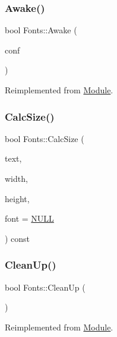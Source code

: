 \subsubsection{\texorpdfstring{Awake()}{Awake()}}
{\footnotesize\ttfamily bool Fonts\+::\+Awake (\begin{DoxyParamCaption}\item[{pugi\+::xml\+\_\+node \&}]{conf }\end{DoxyParamCaption})\hspace{0.3cm}{\ttfamily [virtual]}}



Reimplemented from \mbox{\hyperlink{class_module_a4a283650cf8a73aa0b5599106bc2ba6c}{Module}}.

\mbox{\label{class_fonts_a5210938601222509c4fd3756e2be59ae}} 
\subsubsection{\texorpdfstring{CalcSize()}{CalcSize()}}
{\footnotesize\ttfamily bool Fonts\+::\+Calc\+Size (\begin{DoxyParamCaption}\item[{const char $\ast$}]{text,  }\item[{int \&}]{width,  }\item[{int \&}]{height,  }\item[{\+\_\+\+T\+T\+F\+\_\+\+Font $\ast$}]{font = {\ttfamily \mbox{\hyperlink{_defs_8h_a070d2ce7b6bb7e5c05602aa8c308d0c4}{N\+U\+LL}}} }\end{DoxyParamCaption}) const}

\mbox{\label{class_fonts_afc4912317ca40199a71f7db1024c006d}} 
\subsubsection{\texorpdfstring{CleanUp()}{CleanUp()}}
{\footnotesize\ttfamily bool Fonts\+::\+Clean\+Up (\begin{DoxyParamCaption}{ }\end{DoxyParamCaption})\hspace{0.3cm}{\ttfamily [virtual]}}



Reimplemented from \mbox{\hyperlink{class_module_a77d7a006e42c0bd10110e1adbd4598cb}{Module}}.

